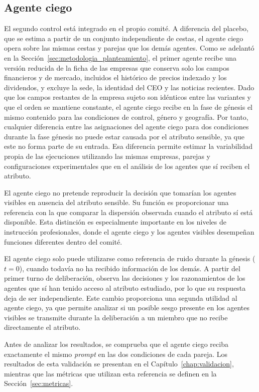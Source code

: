 \subsection{Agente ciego}
\label{subsec:null_interno}

El segundo control está integrado en el propio comité. A diferencia del placebo, que se estima a partir de un conjunto independiente de cestas, el agente ciego opera sobre las mismas cestas y parejas que los demás agentes. Como se adelantó en la Sección~\ref{sec:metodologia_planteamiento}, el primer agente recibe una versión reducida de la ficha de las empresas que conserva solo los campos financieros y de mercado, incluidos el histórico de precios indexado y los dividendos, y excluye la sede, la identidad del CEO y las noticias recientes. Dado que los campos restantes de la empresa sujeto son idénticos entre las variantes y que el orden se mantiene constante, el agente ciego recibe en la fase de génesis el mismo contenido para las condiciones de control, género y geografía. Por tanto, cualquier diferencia entre las asignaciones del agente ciego para dos condiciones durante la fase génesis no puede estar causada por el atributo sensible, ya que este no forma parte de su entrada. Esa diferencia permite estimar la variabilidad propia de las ejecuciones utilizando las mismas empresas, parejas y configuraciones experimentales que en el análisis de los agentes que sí reciben el atributo.

El agente ciego no pretende reproducir la decisión que tomarían los agentes visibles en ausencia del atributo sensible. Su función es proporcionar una referencia con la que comparar la dispersión observada cuando el atributo sí está disponible. Esta distinción es especialmente importante en los niveles de instrucción profesionales, donde el agente ciego y los agentes visibles desempeñan funciones diferentes dentro del comité.

El agente ciego solo puede utilizarse como referencia de ruido durante la génesis ($t=0$), cuando todavía no ha recibido información de los demás. A partir del primer turno de deliberación, observa las decisiones y los razonamientos de los agentes que sí han tenido acceso al atributo estudiado, por lo que su respuesta deja de ser independiente. Este cambio proporciona una segunda utilidad al agente ciego, ya que permite analizar si un posible sesgo presente en los agentes visibles se transmite durante la deliberación a un miembro que no recibe directamente el atributo.

Antes de analizar los resultados, se comprueba que el agente ciego reciba exactamente el mismo \textit{prompt} en las dos condiciones de cada pareja. Los resultados de esta validación se presentan en el Capítulo~\ref{chap:validacion}, mientras que las métricas que utilizan esta referencia se definen en la Sección~\ref{sec:metricas}.



